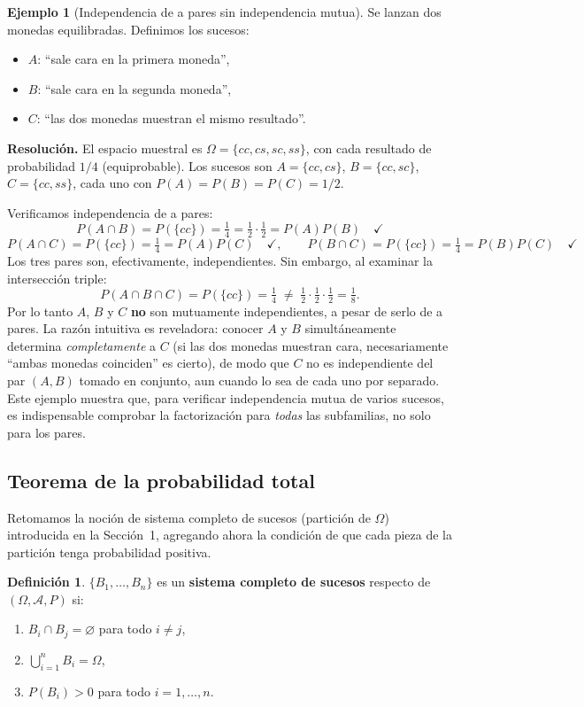 \documentclass[11pt,a4paper]{article}
\theoremstyle{plain}
\theoremstyle{definition}
\newtheorem{definicion}[teorema]{Definición}
\newtheorem{ejemplo}[teorema]{Ejemplo}
\theoremstyle{remark}
\begin{document}
\begin{ejemplo}[Independencia de a pares sin independencia mutua]
Se lanzan dos monedas equilibradas. Definimos los sucesos:
\begin{itemize}
\item $A$: ``sale cara en la primera moneda'',
\item $B$: ``sale cara en la segunda moneda'',
\item $C$: ``las dos monedas muestran el mismo resultado''.
\end{itemize}
\end{ejemplo}

\textbf{Resolución.} El espacio muestral es $\Omega=\{cc,cs,sc,ss\}$, con cada resultado de probabilidad $1/4$ (equiprobable). Los sucesos son $A=\{cc,cs\}$, $B=\{cc,sc\}$, $C=\{cc,ss\}$, cada uno con $P(A)=P(B)=P(C)=1/2$.

Verificamos independencia de a pares:
\[
P(A\cap B) = P(\{cc\}) = \tfrac14 = \tfrac12\cdot\tfrac12=P(A)P(B) \quad\checkmark
\]
\[
P(A\cap C) = P(\{cc\}) = \tfrac14 = P(A)P(C) \quad\checkmark, \qquad P(B\cap C) = P(\{cc\}) = \tfrac14 = P(B)P(C) \quad\checkmark
\]
Los tres pares son, efectivamente, independientes. Sin embargo, al examinar la intersección triple:
\[
P(A\cap B\cap C) = P(\{cc\}) = \tfrac14 \;\neq\; \tfrac12\cdot\tfrac12\cdot\tfrac12 = \tfrac18.
\]
Por lo tanto $A$, $B$ y $C$ \textbf{no} son mutuamente independientes, a pesar de serlo de a pares. La razón intuitiva es reveladora: conocer $A$ y $B$ simultáneamente determina \emph{completamente} a $C$ (si las dos monedas muestran cara, necesariamente ``ambas monedas coinciden'' es cierto), de modo que $C$ no es independiente del par $(A,B)$ tomado en conjunto, aun cuando lo sea de cada uno por separado. Este ejemplo muestra que, para verificar independencia mutua de varios sucesos, es indispensable comprobar la factorización para \emph{todas} las subfamilias, no solo para los pares.

\subsection{Teorema de la probabilidad total}

Retomamos la noción de sistema completo de sucesos (partición de $\Omega$) introducida en la Sección~1, agregando ahora la condición de que cada pieza de la partición tenga probabilidad positiva.

\begin{definicion}
$\{B_1,\dots,B_n\}$ es un \textbf{sistema completo de sucesos} respecto de $(\Omega,\mathcal{A},P)$ si:
\begin{enumerate}
\item $B_i \cap B_j = \varnothing$ para todo $i\neq j$,
\item $\displaystyle\bigcup_{i=1}^n B_i = \Omega$,
\item $P(B_i) > 0$ para todo $i=1,\dots,n$.
\end{enumerate}
\end{definicion}
\end{document}
